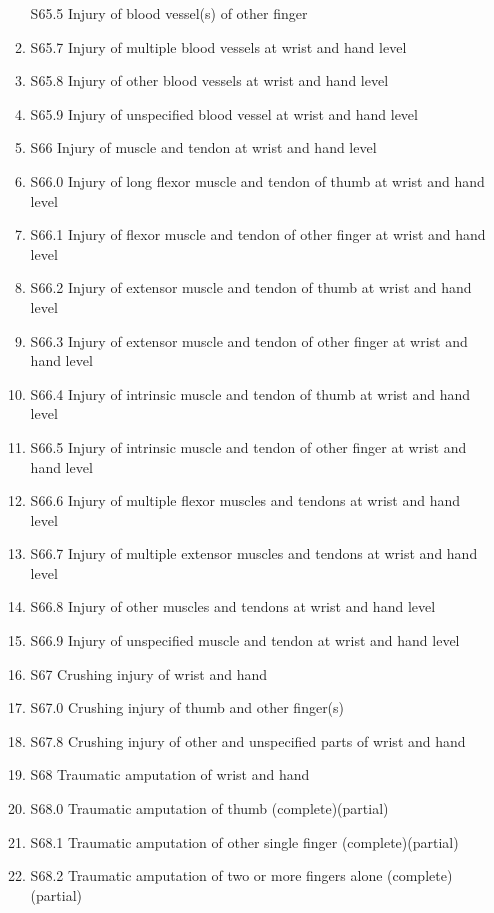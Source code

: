 \documentclass[
]{scrartcl}
\begin{document}
\begin{itemize}
\begin{enumerate}
    S65.5 Injury of blood vessel(s) of other finger
  \item
    S65.7 Injury of multiple blood vessels at wrist and hand level
  \item
    S65.8 Injury of other blood vessels at wrist and hand level
  \item
    S65.9 Injury of unspecified blood vessel at wrist and hand level
  \item
    S66 Injury of muscle and tendon at wrist and hand level
  \item
    S66.0 Injury of long flexor muscle and tendon of thumb at wrist and
    hand level
  \item
    S66.1 Injury of flexor muscle and tendon of other finger at wrist
    and hand level
  \item
    S66.2 Injury of extensor muscle and tendon of thumb at wrist and
    hand level
  \item
    S66.3 Injury of extensor muscle and tendon of other finger at wrist
    and hand level
  \item
    S66.4 Injury of intrinsic muscle and tendon of thumb at wrist and
    hand level
  \item
    S66.5 Injury of intrinsic muscle and tendon of other finger at wrist
    and hand level
  \item
    S66.6 Injury of multiple flexor muscles and tendons at wrist and
    hand level
  \item
    S66.7 Injury of multiple extensor muscles and tendons at wrist and
    hand level
  \item
    S66.8 Injury of other muscles and tendons at wrist and hand level
  \item
    S66.9 Injury of unspecified muscle and tendon at wrist and hand
    level
  \item
    S67 Crushing injury of wrist and hand
  \item
    S67.0 Crushing injury of thumb and other finger(s)
  \item
    S67.8 Crushing injury of other and unspecified parts of wrist and
    hand
  \item
    S68 Traumatic amputation of wrist and hand
  \item
    S68.0 Traumatic amputation of thumb (complete)(partial)
  \item
    S68.1 Traumatic amputation of other single finger
    (complete)(partial)
  \item
    S68.2 Traumatic amputation of two or more fingers alone
    (complete)(partial)

\end{enumerate}
\end{itemize}
\end{document}
